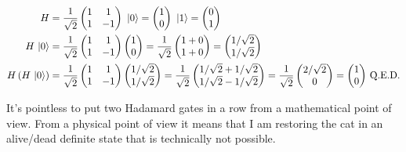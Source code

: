 	\begin{align*}
		H&=\frac{1}{\sqrt{2}}\begin{pmatrix}1&1\\1&-1\end{pmatrix}\,\,\ket{0}=\begin{pmatrix}1\\0\end{pmatrix}\,\,\ket{1}=\begin{pmatrix}0\\1\end{pmatrix}\\
		H\,\ket{0}&=\frac{1}{\sqrt{2}}\begin{pmatrix}1&1\\1&-1\end{pmatrix}\begin{pmatrix}1\\0\end{pmatrix}=\frac{1}{\sqrt{2}}\begin{pmatrix}1+0\\1+0\end{pmatrix}=\begin{pmatrix}1/\sqrt{2}\\1/\sqrt{2}\end{pmatrix}\\
		H\,(H\,\ket{0})&=\frac{1}{\sqrt{2}}\begin{pmatrix}1&1\\1&-1\end{pmatrix}\begin{pmatrix}1/\sqrt{2}\\1/\sqrt{2}\end{pmatrix}=\frac{1}{\sqrt{2}}\begin{pmatrix}1/\sqrt{2}+1/\sqrt{2}\\1/\sqrt{2}-1/\sqrt{2}\end{pmatrix}=\frac{1}{\sqrt{2}}\begin{pmatrix}2/\sqrt{2}\\0\end{pmatrix}=\begin{pmatrix}1\\0\end{pmatrix}\,\text{Q.E.D.}
	\end{align*}

	It's pointless to put two Hadamard gates in a row from a mathematical point of view.
	From a physical point of view it means that I am restoring the cat in an alive/dead definite state that is technically not possible.

